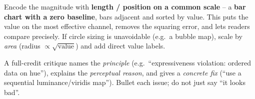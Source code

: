 \begin{keybox}[Fix]
Encode the magnitude with \textbf{length / position on a common scale} -- a
\textbf{bar chart with a zero baseline}, bars adjacent and sorted by value.
This puts the value on the most effective channel, removes the squaring error,
and lets readers compare precisely. If circle sizing is unavoidable (e.g.\ a
bubble map), scale by \emph{area} (radius $\propto\sqrt{\text{value}}$) and add
direct value labels.
\end{keybox}

\begin{exambox}
A full-credit critique names the \emph{principle} (e.g.\ ``expressiveness
violation: ordered data on hue''), explains the \emph{perceptual reason}, and
gives a \emph{concrete fix} (``use a sequential luminance/viridis map''). Bullet
each issue; do not just say ``it looks bad''.
\end{exambox}
